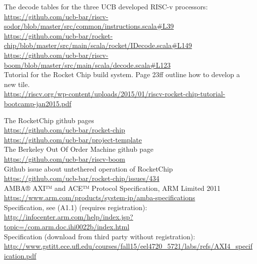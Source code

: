 \documentclass[journal,a4paper]{IEEEtran}
\begin{document}
\begin{thebibliography}{1}
		The decode tables for the three UCB developed RISC-v processors:
		\url{https://github.com/ucb-bar/riscv-sodor/blob/master/src/common/instructions.scala#L39}\\
		\url{https://github.com/ucb-bar/rocket-chip/blob/master/src/main/scala/rocket/IDecode.scala#L149}\\
		\url{https://github.com/ucb-bar/riscv-boom/blob/master/src/main/scala/decode.scala#L123}\\


















		Tutorial for the  Rocket Chip build system. Page 23ff outline how to develop a new tile.\\
		\url{https://riscv.org/wp-content/uploads/2015/01/riscv-rocket-chip-tutorial-bootcamp-jan2015.pdf}

		The RocketChip github pages\\
		\url{https://github.com/ucb-bar/rocket-chip}\\
		\url{https://github.com/ucb-bar/project-template}\\

		The Berkeley Out Of Order Machine github page\\
		\url{https://github.com/ucb-bar/riscv-boom}\\

		Github issue about untethered operation of RocketChip\\
		\url{https://github.com/ucb-bar/rocket-chip/issues/434}\\

		AMBA® AXI™ and ACE™ Protocol Specification, ARM Limited 2011\\
		\url{https://www.arm.com/products/system-ip/amba-specifications}\\
		Specification, see (A1.1) (requires registration):\\
		\url{http://infocenter.arm.com/help/index.jsp?topic=/com.arm.doc.ihi0022b/index.html}\\
		Specification (download from third party without registration):\\
		\url{http://www.gstitt.ece.ufl.edu/courses/fall15/eel4720_5721/labs/refs/AXI4_specification.pdf}\\


\end{thebibliography}
\end{document}
